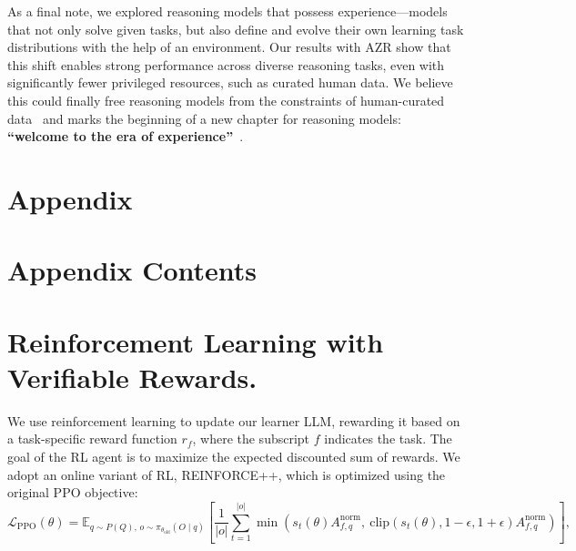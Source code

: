 \documentclass{article}
\begin{document}
As a final note, we explored reasoning models that possess experience—models that not only solve given tasks, but also define and evolve their own learning task distributions with the help of an environment. Our results with AZR show that this shift enables strong performance across diverse reasoning tasks, even with significantly fewer privileged resources, such as curated human data. We believe this could finally free reasoning models from the constraints of human-curated data~\citep{jxmo2024noideas} and marks the beginning of a new chapter for reasoning models: \textbf{``welcome to the era of experience''}~\cite{silver2025era,zhao2024expel}.






\newpage
\appendix
\section*{Appendix}

\renewcommand{\thesection}{\Alph{section}} %

\startcontents[appendix] %
\section*{Appendix Contents} %
               {\setcounter{tocdepth}{2}} %
\clearpage



\section{Reinforcement Learning with Verifiable Rewards.}\label{ref:rlvr} We use reinforcement learning to update our learner LLM, rewarding it based on a task-specific reward function \(r_f\), where the subscript \(f\) indicates the task. The goal of the RL agent is to maximize the expected discounted sum of rewards. We adopt an online variant of RL, REINFORCE++, which is optimized using the original PPO objective:
\begin{equation}
\mathcal{L}_{\text{PPO}}(\theta) = \mathbb{E}_{q \sim P(Q),\, o \sim \pi_{\theta_{\text{old}}}(O \mid q)} \left[ 
\frac{1}{|o|} \sum_{t=1}^{|o|} \min \left( s_t(\theta) A^{\text{norm}}_{f,q},\ \text{clip}\left(s_t(\theta), 1 - \epsilon, 1 + \epsilon\right) A^{\text{norm}}_{f,q} \right)
\right],
\end{equation}
\end{document}
